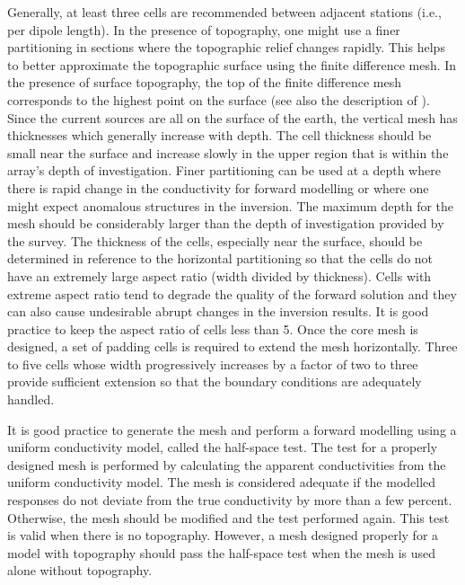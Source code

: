 Generally, at least three cells are recommended between adjacent stations (i.e., per dipole length). In the presence of topography, one might use a finer partitioning in sections where the topographic relief changes rapidly. This helps to better approximate the topographic surface using the finite difference mesh. In the presence of surface topography, the top of the finite difference mesh corresponds to the highest point on the surface (see also the description of ). Since the current sources are all on the surface of the earth, the vertical mesh has thicknesses which generally increase with depth. The cell thickness should be small near the surface and increase slowly in the upper region that is within the array's depth of investigation. Finer partitioning can be used at a depth where there is rapid change in the conductivity for forward modelling or where one might expect anomalous structures in the inversion. The maximum depth for the mesh should be considerably larger than the depth of investigation provided by the survey. The thickness of the cells, especially near the surface, should be determined in reference to the horizontal partitioning so that the cells do not have an extremely large aspect ratio (width divided by thickness). Cells with extreme aspect ratio tend to degrade the quality of the forward solution and they can also cause undesirable abrupt changes in the inversion results. It is good practice to keep the aspect ratio of cells less than 5. 
Once the core mesh is designed, a set of padding cells is required to extend the mesh horizontally. Three to five cells whose width progressively increases by a factor of two to three provide sufficient extension so that the boundary conditions are adequately handled. 

It is good practice to generate the mesh and perform a forward modelling using a uniform conductivity model, called the half-space test. The test for a properly designed mesh is performed by calculating the apparent conductivities from the uniform conductivity model. The mesh is considered adequate if the modelled responses do not deviate from the true conductivity by more than a few percent. Otherwise, the mesh should be modified and the test performed again. This test is valid when there is no topography. However, a mesh designed properly for a model with topography should pass the half-space test when the mesh is used alone without topography.